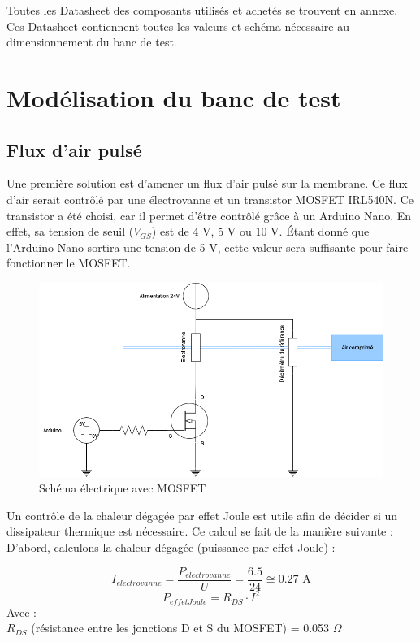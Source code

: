 Toutes les Datasheet des composants utilisés et achetés se trouvent en annexe. Ces Datasheet contiennent toutes les valeurs et schéma nécessaire
au dimensionnement du banc de test.

\section{Modélisation du banc de test}
\subsection{Flux d'air pulsé}
Une première solution est d'amener un flux d'air pulsé sur la membrane. Ce flux d'air serait contrôlé par une électrovanne et un
transistor MOSFET IRL540N. Ce transistor a été choisi, car il permet d'être contrôlé grâce à un Arduino Nano. En effet, sa tension de seuil
($V_{GS}$) est de 4 V, 5 V ou 10 V. Étant donné que l'Arduino Nano sortira une tension de 5 V, cette valeur sera suffisante pour faire fonctionner
le MOSFET.
\begin{figure}[H]
    \centering
    \includegraphics[scale=0.6]{assets/figures/MOSFET.png}
    \caption{Schéma électrique avec MOSFET}
    \label{fig:MOSFET}
\end{figure}
Un contrôle de la chaleur dégagée par effet Joule est utile afin de décider si un dissipateur thermique est nécessaire. Ce calcul se fait
de la manière suivante :\\
D'abord, calculons la chaleur dégagée (puissance par effet Joule) :

\[I_{electrovanne} = \frac{P_{electrovanne}}{U} = \frac{6.5}{24} \cong 0.27 \text{ A} \]
\[P_{effetJoule} = R_{DS}\cdot I^2\]
Avec :\\
$R_{DS}$ (résistance entre les jonctions D et S du MOSFET) = 0.053 $\Omega$

